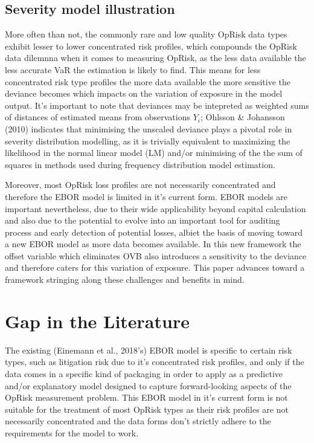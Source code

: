\documentclass{DissertateUSU}
\begin{document}
\subsection{Severity model illustration}
\label{ssec:Severity model illustration}

More often than not, the commonly rare and low quality OpRisk data types
exhibit lesser to lower concentrated risk profiles, which compounds the
OpRisk data dilemnna when it comes to measuring OpRisk, as the less data
available the less accurate VaR the estimation is likely to find. This
means for less concentrated risk type profiles the more data available
the more sensitive the deviance becomes which impacts on the variation
of exposure in the model output. It's important to note that deviances
may be intepreted as weighted sums of distances of estimated means from
observations \(Y_i\); Ohlsson \& Johansson (2010) indicates that
minimising the unscaled deviance plays a pivotal role in severity
distribution modelling, as it is trivially equivalent to maximizing the
likelihood in the normal linear model (LM) and/or minimising of the the
sum of squares in methods used during frequency distribution model
estimation. \medskip

Moreover, most OpRisk loss profiles are not necessarily concentrated and
therefore the EBOR model is limited in it's current form. EBOR models
are important nevertheless, due to their wide applicability beyond
capital calculation and also due to the potential to evolve into an
important tool for auditing process and early detection of potential
losses, albiet the basis of moving toward a new EBOR model as more data
becomes available. In this new framework the offset variable which
eliminates OVB also introduces a sensitivity to the deviance and
therefore caters for this variation of exposure. This paper advances
toward a framework stringing along these challenges and benefits in
mind.

\section{Gap in the Literature}
\label{sec:Gap in the Literature}

The existing (Einemann et al., 2018's) EBOR model is specific to certain
risk types, such as litigation risk due to it's concentrated risk
profiles, and only if the data comes in a specific kind of packaging in
order to apply as a predictive and/or explanatory model designed to
capture forward-looking aspects of the OpRisk measurement problem. This
EBOR model in it's current form is not suitable for the treatment of
most OpRisk types as their risk profiles are not necessarily
concentrated and the data forms don't strictly adhere to the
requirements for the model to work.\medskip
\end{document}
